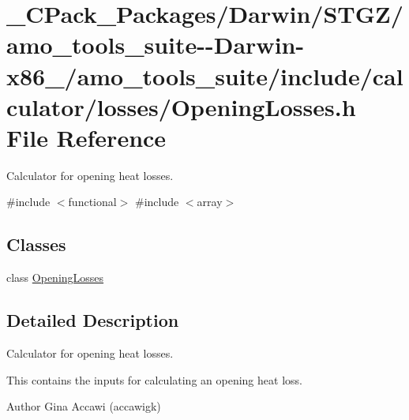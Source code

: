 \hypertarget{___c_pack___packages_2_darwin_2_s_t_g_z_2amo__tools__suite--_darwin-x86__64_2amo__tools__suite_2d71043f6c6a078ed35d9feac98503cfb}{}\section{\+\_\+\+C\+Pack\+\_\+\+Packages/\+Darwin/\+S\+T\+G\+Z/amo\+\_\+tools\+\_\+suite-\/-\/\+Darwin-\/x86\+\_/amo\+\_\+tools\+\_\+suite/include/calculator/losses/\+Opening\+Losses.h File Reference}
\label{___c_pack___packages_2_darwin_2_s_t_g_z_2amo__tools__suite--_darwin-x86__64_2amo__tools__suite_2d71043f6c6a078ed35d9feac98503cfb}


Calculator for opening heat losses.  


{\ttfamily \#include $<$functional$>$}\newline
{\ttfamily \#include $<$array$>$}\newline
\subsection*{Classes}
\begin{DoxyCompactItemize}
\item 
class \hyperlink{class_opening_losses}{Opening\+Losses}
\end{DoxyCompactItemize}


\subsection{Detailed Description}
Calculator for opening heat losses. 

This contains the inputs for calculating an opening heat loss.

\begin{DoxyAuthor}{Author}
Gina Accawi (accawigk) 
\end{DoxyAuthor}
